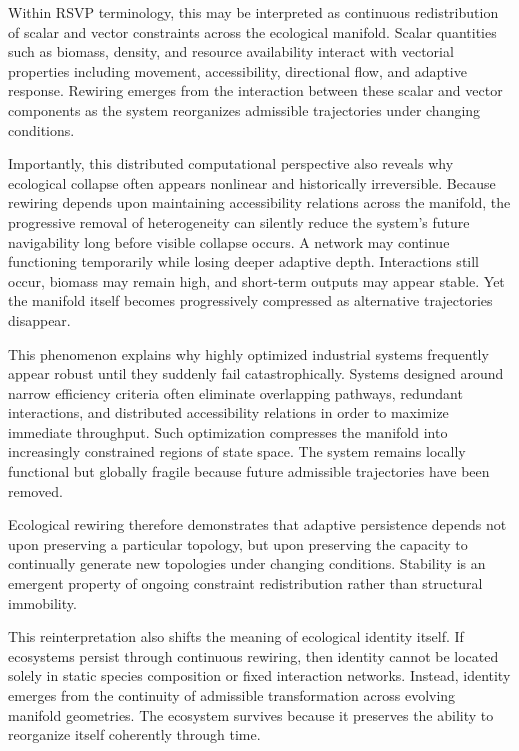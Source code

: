 \documentclass[11pt,a4paper]{article}
\begin{document}
Within RSVP terminology, this may be interpreted as continuous redistribution of scalar and vector constraints across the ecological manifold. Scalar quantities such as biomass, density, and resource availability interact with vectorial properties including movement, accessibility, directional flow, and adaptive response. Rewiring emerges from the interaction between these scalar and vector components as the system reorganizes admissible trajectories under changing conditions.

Importantly, this distributed computational perspective also reveals why ecological collapse often appears nonlinear and historically irreversible. Because rewiring depends upon maintaining accessibility relations across the manifold, the progressive removal of heterogeneity can silently reduce the system's future navigability long before visible collapse occurs. A network may continue functioning temporarily while losing deeper adaptive depth. Interactions still occur, biomass may remain high, and short-term outputs may appear stable. Yet the manifold itself becomes progressively compressed as alternative trajectories disappear.

This phenomenon explains why highly optimized industrial systems frequently appear robust until they suddenly fail catastrophically. Systems designed around narrow efficiency criteria often eliminate overlapping pathways, redundant interactions, and distributed accessibility relations in order to maximize immediate throughput. Such optimization compresses the manifold into increasingly constrained regions of state space. The system remains locally functional but globally fragile because future admissible trajectories have been removed.

Ecological rewiring therefore demonstrates that adaptive persistence depends not upon preserving a particular topology, but upon preserving the capacity to continually generate new topologies under changing conditions. Stability is an emergent property of ongoing constraint redistribution rather than structural immobility.

This reinterpretation also shifts the meaning of ecological identity itself. If ecosystems persist through continuous rewiring, then identity cannot be located solely in static species composition or fixed interaction networks. Instead, identity emerges from the continuity of admissible transformation across evolving manifold geometries. The ecosystem survives because it preserves the ability to reorganize itself coherently through time.
\end{document}
